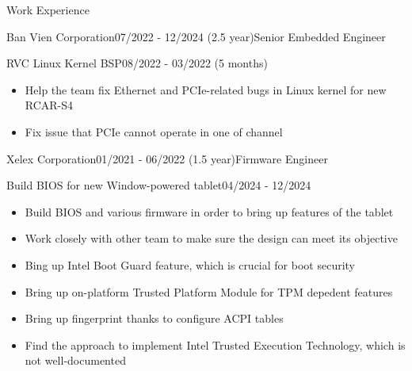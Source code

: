 \documentclass{resume} %
\begin{document}
\begin{rSection}{Work Experience}
\begin{rCompanySubsection}{Ban Vien Corporation}{07/2022 - 12/2024 (2.5 year)}{Senior Embedded Engineer}{}
{        \begin{rProjectSubsubsectionV2}{RVC Linux Kernel BSP}{08/2022 - 03/2022 (5 months)}
        {
            \begin{itemize}
                \item Help the team fix Ethernet and PCIe-related bugs in Linux kernel for new RCAR-S4
            \end{itemize}
        }{
            \begin{itemize}
                \item Fix issue that PCIe cannot operate in one of channel
            \end{itemize}
        }
        \end{rProjectSubsubsectionV2}
    }
    \end{rCompanySubsection}
    \begin{rCompanySubsection}{Xelex Corporation}{01/2021 - 06/2022 (1.5 year)}{Firmware Engineer}{}{
        \begin{rProjectSubsubsectionV2}{Build BIOS for new Window-powered tablet}{04/2024 - 12/2024}{
            \begin{itemize}
                \item Build BIOS and various firmware in order to bring up features of the tablet
                \item Work closely with other team to make sure the design can meet its objective
            \end{itemize}
        }{
            \begin{itemize}
                \item Bing up Intel Boot Guard feature, which is crucial for boot security
                \item Bring up on-platform Trusted Platform Module for TPM depedent features
                \item Bring up fingerprint thanks to configure ACPI tables
                \item Find the approach to implement Intel Trusted Execution Technology, which is not well-documented
            \end{itemize}
        }
        \end{rProjectSubsubsectionV2}
    }
    \end{rCompanySubsection}


\end{rSection}
\end{document}
